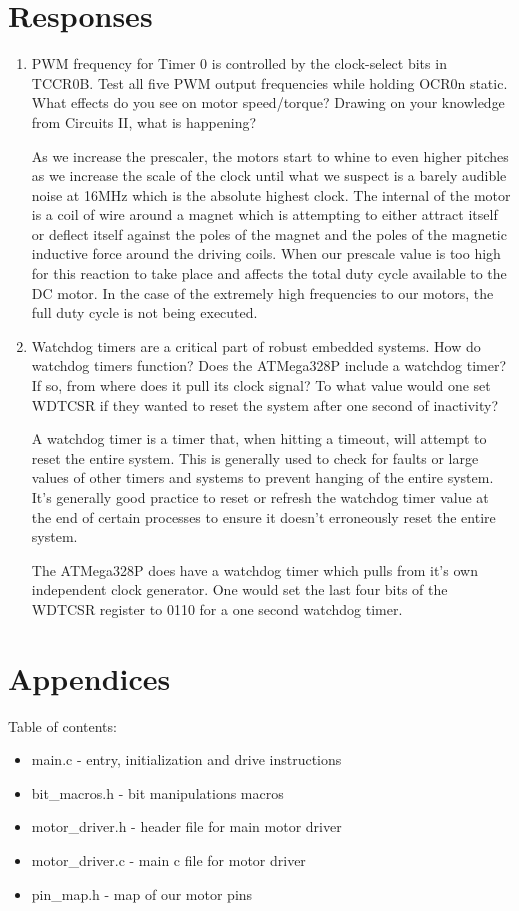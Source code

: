 \documentclass[letterpaper,11pt]{texMemo} %
\begin{document}
\section*{Responses}
\begin{enumerate}
\item  PWM frequency for Timer 0 is controlled by the clock-select bits in TCCR0B. Test all five
PWM output frequencies while holding OCR0n static. What effects do you see on motor
speed/torque? Drawing on your knowledge from Circuits II, what is happening?

As we increase the prescaler, the motors start to whine to even higher pitches as we increase the scale
of the clock until what we suspect is a barely audible noise at 16MHz which is the absolute highest clock.
The internal of the motor is a coil of wire around a magnet which is attempting to either attract itself 
or deflect itself against the poles of the magnet and the poles of the magnetic inductive force around the 
driving coils. When our prescale value is too high for this reaction to take place and affects the total duty
cycle available to the DC motor. In the case of the extremely high frequencies to our motors, the full duty 
cycle is not being executed.



\item  Watchdog timers are a critical part of robust embedded systems. How do watchdog timers
function? Does the ATMega328P include a watchdog timer? If so, from where does it pull
its clock signal? To what value would one set WDTCSR if they wanted to reset the system
after one second of inactivity?

A watchdog timer is a timer that, when hitting a timeout, will attempt to reset the entire 
system. This is generally used to check for faults or large values of other timers and systems 
to prevent hanging of the entire system. It's generally good practice to reset or refresh the watchdog 
timer value at the end of certain processes to ensure it doesn't erroneously reset the entire system.

The ATMega328P does have a watchdog timer which pulls from it's own independent clock generator. One 
would set the last four bits of the WDTCSR register to 0110 for a one second watchdog timer.


\end{enumerate} 

\newpage
\section*{Appendices}
Table of contents:
\begin{itemize}
    \item main.c - entry, initialization and drive instructions
    \item bit\_macros.h - bit manipulations macros
    \item motor\_driver.h - header file for main motor driver
    \item motor\_driver.c - main c file for motor driver
    \item pin\_map.h - map of our motor pins
\end{itemize}
\newpage
\end{document}
